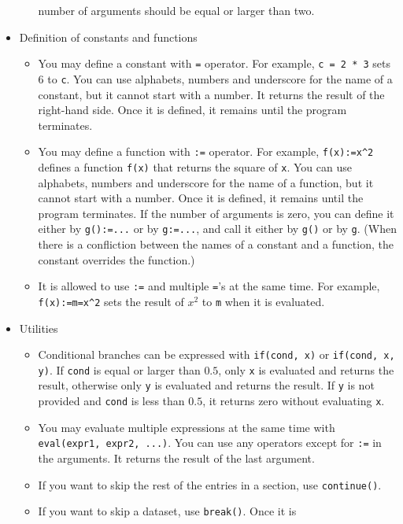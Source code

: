 \documentclass[12pt]{article}
\begin{document}
\begin{itemize}
\begin{itemize}
       number of arguments should be equal or larger than two.
\end{itemize}
\item Definition of constants and functions
\begin{itemize}
 \item You may define a constant with
       \verb|=| operator. For example, \verb|c = 2 * 3| sets 6 to \verb|c|. You
       can use alphabets, numbers and underscore for the name of a
       constant, but it cannot start with a number. It returns the
       result of the right-hand side. Once it is defined, it remains
       until the program terminates.
 \item You may define a function with
       \verb|:=| operator. For example, \verb|f(x):=x^2| defines a
       function \verb|f(x)| that returns the square of \verb|x|.  You
       can use alphabets, numbers and underscore for the name of a
       function, but it cannot start with a number. Once it is defined,
       it remains until the program terminates. If the number of
       arguments is zero, you can define it either by
       \verb|g():=...| or by \verb|g:=...|, and call it either by \verb|g()|
       or by \verb|g|. (When there is a confliction between the names of
       a constant and a function, the constant overrides the function.)
 \item It is allowed to use
       \verb|:=| and multiple \verb|=|'s at the same time. For example, 
       \verb|f(x):=m=x^2| sets the result of $x^2$ to \verb|m|
       when it is evaluated. 
\end{itemize}
\item Utilities
\begin{itemize}
  \item Conditional branches can be expressed with
       \verb|if(cond, x)| or \verb|if(cond, x, y)|. If \verb|cond| is equal or larger than $0.5$, only \verb|x| is evaluated and returns the result, otherwise only \verb|y| is evaluated and returns the result. If \verb|y|
       is not provided and
       \verb|cond| is less than $0.5$, it returns zero without evaluating \verb|x|.
 \item You may evaluate multiple expressions at the same time with
      \verb|eval(expr1, expr2, ...)|. You can use any operators except
      for \verb|:=| in the arguments. It returns the result of the last
      argument.
 \item If you want to skip the rest of the entries in a section, use \verb|continue()|.
 \item If you want to skip a dataset, use \verb|break()|. Once it is

\end{itemize}
\end{itemize}
\end{document}
